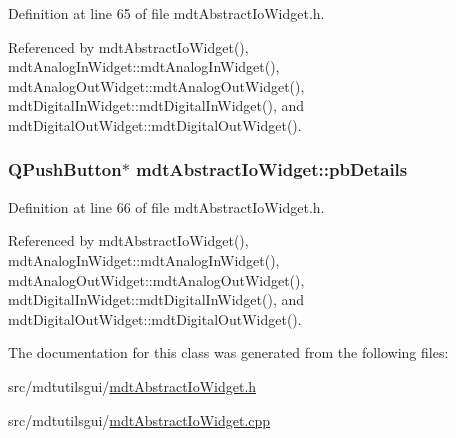 Definition at line 65 of file mdt\-Abstract\-Io\-Widget.\-h.



Referenced by mdt\-Abstract\-Io\-Widget(), mdt\-Analog\-In\-Widget\-::mdt\-Analog\-In\-Widget(), mdt\-Analog\-Out\-Widget\-::mdt\-Analog\-Out\-Widget(), mdt\-Digital\-In\-Widget\-::mdt\-Digital\-In\-Widget(), and mdt\-Digital\-Out\-Widget\-::mdt\-Digital\-Out\-Widget().

\hypertarget{classmdt_abstract_io_widget_a9dc1ad3754eb3e00c50bfba014e887f3}{
\subsubsection[{pb\-Details}]{\setlength{\rightskip}{0pt plus 5cm}Q\-Push\-Button$\ast$ mdt\-Abstract\-Io\-Widget\-::pb\-Details\hspace{0.3cm}{\ttfamily [protected]}}}\label{classmdt_abstract_io_widget_a9dc1ad3754eb3e00c50bfba014e887f3}


Definition at line 66 of file mdt\-Abstract\-Io\-Widget.\-h.



Referenced by mdt\-Abstract\-Io\-Widget(), mdt\-Analog\-In\-Widget\-::mdt\-Analog\-In\-Widget(), mdt\-Analog\-Out\-Widget\-::mdt\-Analog\-Out\-Widget(), mdt\-Digital\-In\-Widget\-::mdt\-Digital\-In\-Widget(), and mdt\-Digital\-Out\-Widget\-::mdt\-Digital\-Out\-Widget().



The documentation for this class was generated from the following files\-:\begin{DoxyCompactItemize}
\item 
src/mdtutilsgui/\hyperlink{mdt_abstract_io_widget_8h}{mdt\-Abstract\-Io\-Widget.\-h}\item 
src/mdtutilsgui/\hyperlink{mdt_abstract_io_widget_8cpp}{mdt\-Abstract\-Io\-Widget.\-cpp}\end{DoxyCompactItemize}
